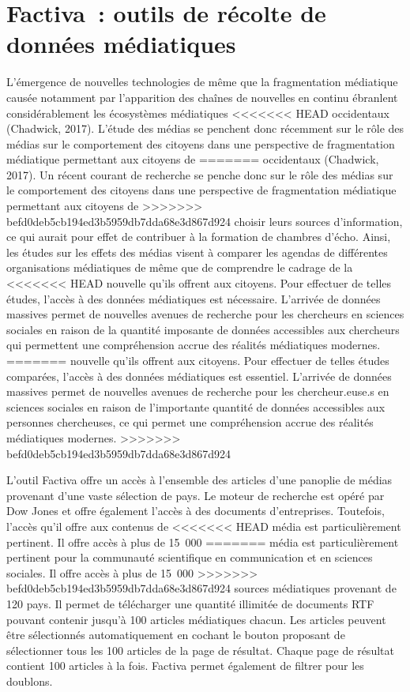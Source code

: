 \documentclass[
  letterpaper,
]{scrbook}
\begin{document}
\hypertarget{factiva-outils-de-ruxe9colte-de-donnuxe9es-muxe9diatiques}{%
\section{\texorpdfstring{\textbf{Factiva~: outils de récolte de données
médiatiques}}{Factiva~: outils de récolte de données médiatiques}}\label{factiva-outils-de-ruxe9colte-de-donnuxe9es-muxe9diatiques}}

L'émergence de nouvelles technologies de même que la fragmentation
médiatique causée notamment par l'apparition des chaînes de nouvelles en
continu ébranlent considérablement les écosystèmes médiatiques
<<<<<<< HEAD
occidentaux (Chadwick, 2017). L'étude des médias se penchent donc
récemment sur le rôle des médias sur le comportement des citoyens dans
une perspective de fragmentation médiatique permettant aux citoyens de
=======
occidentaux (Chadwick, 2017). Un récent courant de recherche se penche
donc sur le rôle des médias sur le comportement des citoyens dans une
perspective de fragmentation médiatique permettant aux citoyens de
>>>>>>> befd0deb5cb194ed3b5959db7dda68e3d867d924
choisir leurs sources d'information, ce qui aurait pour effet de
contribuer à la formation de chambres d'écho. Ainsi, les études sur les
effets des médias visent à comparer les agendas de différentes
organisations médiatiques de même que de comprendre le cadrage de la
<<<<<<< HEAD
nouvelle qu'ils offrent aux citoyens. Pour effectuer de telles études,
l'accès à des données médiatiques est nécessaire. L'arrivée de données
massives permet de nouvelles avenues de recherche pour les chercheurs en
sciences sociales en raison de la quantité imposante de données
accessibles aux chercheurs qui permettent une compréhension accrue des
réalités médiatiques modernes.
=======
nouvelle qu'ils offrent aux citoyens. Pour effectuer de telles études
comparées, l'accès à des données médiatiques est essentiel. L'arrivée de
données massives permet de nouvelles avenues de recherche pour les
chercheur.euse.s en sciences sociales en raison de l'importante quantité
de données accessibles aux personnes chercheuses, ce qui permet une
compréhension accrue des réalités médiatiques modernes.
>>>>>>> befd0deb5cb194ed3b5959db7dda68e3d867d924

L'outil Factiva offre un accès à l'ensemble des articles d'une panoplie
de médias provenant d'une vaste sélection de pays. Le moteur de
recherche est opéré par Dow Jones et offre également l'accès à des
documents d'entreprises. Toutefois, l'accès qu'il offre aux contenus de
<<<<<<< HEAD
média est particulièrement pertinent. Il offre accès à plus de 15~000
=======
média est particulièrement pertinent pour la communauté scientifique en
communication et en sciences sociales. Il offre accès à plus de 15~000
>>>>>>> befd0deb5cb194ed3b5959db7dda68e3d867d924
sources médiatiques provenant de 120 pays. Il permet de télécharger une
quantité illimitée de documents RTF pouvant contenir jusqu'à 100
articles médiatiques chacun. Les articles peuvent être sélectionnés
automatiquement en cochant le bouton proposant de sélectionner tous les
100 articles de la page de résultat. Chaque page de résultat contient
100 articles à la fois. Factiva permet également de filtrer pour les
doublons.
\end{document}

